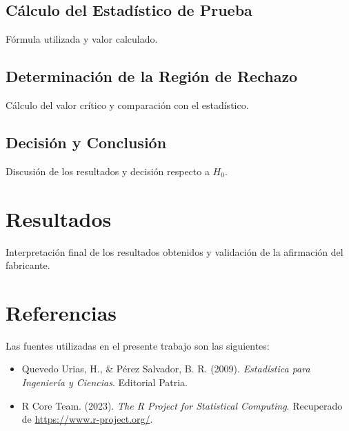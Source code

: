 \documentclass[a4paper,12pt]{article}
\begin{document}
\subsection{Cálculo del Estadístico de Prueba}
Fórmula utilizada y valor calculado.
\subsection{Determinación de la Región de Rechazo}
Cálculo del valor crítico y comparación con el estadístico.
\subsection{Decisión y Conclusión}
Discusión de los resultados y decisión respecto a \( H_0 \).

\section{Resultados}
Interpretación final de los resultados obtenidos y validación de la afirmación del fabricante.

\section{Referencias}

Las fuentes utilizadas en el presente trabajo son las siguientes:

\begin{itemize}
    \item Quevedo Urias, H., \& Pérez Salvador, B. R. (2009). \textit{Estadística para Ingeniería y Ciencias}. Editorial Patria.
    \item R Core Team. (2023). \textit{The R Project for Statistical Computing}. Recuperado de \url{https://www.r-project.org/}.
\end{itemize}

\printbibliography
\end{document}
